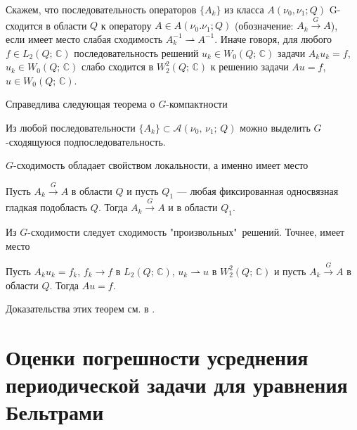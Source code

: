 
\begin{definition}
Скажем, что последовательность  операторов $\{A_k\}$ из класса
$A(\nu_0,\nu_1; Q)$ G-сходится в области $Q$ к оператору $A \in A(\nu_0.\nu_1; Q)$ (обозначение:
$A_k\overset{G}\longrightarrow A$), если имеет место слабая сходимость $ A_k^{-1}\rightharpoonup A^{-1}$. Иначе говоря, для любого $f\in L_2(Q;\,\mathbb{C})$ последовательность решений $u_k\in W_0(Q;\,\mathbb{C})$ задачи $A_ku_k=f$, $u_k\in W_0(Q;\,\mathbb{C})$ слабо сходится в $W_2^2(Q;\,\mathbb{C})$ к решению задачи $Au=f$, $u\in W_0(Q;\,\mathbb{C})$.
\end{definition}


Справедлива следующая теорема о $G$-компактности
\begin{theorem} \label{smm1_teor2}
    Из любой последовательности $\{A_k\}\subset \mathcal{A}(\nu_0,\,\nu_1;\,Q)$
    можно выделить $G$-сходящуюся подпоследовательность.
\end{theorem}
$G$-сходимость обладает свойством локальности, а именно имеет место
\begin{theorem} \label{smm1_teor3}
     Пусть $A_k\overset{G}{\to}A$  в области $Q$ и пусть $Q_1$ --- любая
     фиксированная односвязная гладкая подобласть $Q$.
     Тогда $A_k\overset{G}\longrightarrow A$ и в области $Q_1$.
\end{theorem}

Из $G$-сходимости следует сходимость "произвольных"\     решений. Точнее, имеет место
\begin{theorem}\label{teor4}
 Пусть $A_ku_k=f_k$, $f_k\to f$ в $L_2(Q;\,\mathbb{C})$, $u_k\rightharpoonup u $
 в $W_2^2(Q;\,\mathbb{C})$ и пусть $A_k\overset{G}\longrightarrow A$ в области $Q$.
 Тогда $Au=f$.
\end{theorem}

Доказательства этих теорем см. в \cite{smm_DZh}.











\chapter{Оценки погрешности усреднения периодической задачи для уравнения Бельтрами}


%
%
%


